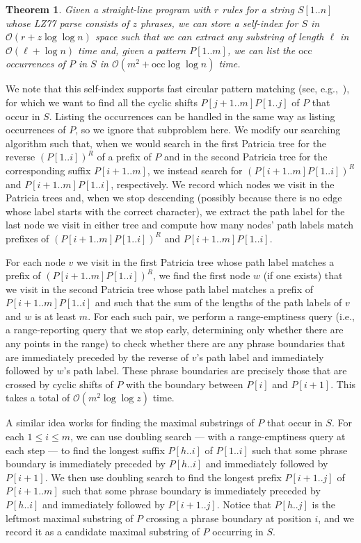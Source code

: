 \documentclass[review]{elsarticle}
\newtheorem{theorem}{Theorem}
\newcommand{\Oh}[1]
    {\ensuremath{\mathcal{O}\!\left( {#1} \right)}}
\newcommand{\occ}
    {\ensuremath{\mathrm{occ}}}
\begin{document}
\begin{theorem} \label{thm:unbalanced}
Given a straight-line program with $r$ rules for a string \(S [1..n]\) whose LZ77 parse consists of $z$ phrases, we can store a self-index for $S$ in $\Oh{r + z \log \log n}$ space such that we can extract any substring of length $\ell$ in $\Oh{\ell + \log n}$ time and, given a pattern \(P [1..m]\), we can list the $\occ$ occurrences of $P$ in $S$ in $\Oh{m^2 + \occ \log \log n}$ time.
\end{theorem}

We note that this self-index supports fast circular pattern matching (see, e.g.,~\cite{IR08}), for which we want to find all the cyclic shifts \(P [j + 1..m] P [1..j]\) of $P$ that occur in $S$.  Listing the occurrences can be handled in the same way as listing occurrences of $P$, so we ignore that subproblem here.  We modify our searching algorithm such that, when we would search in the first Patricia tree for the reverse \((P [1..i])^R\) of a prefix of $P$ and in the second Patricia tree for the corresponding suffix \(P [i + 1..m]\), we instead search for \((P [i + 1..m] P [1..i])^R\) and \(P [i + 1..m] P [1..i]\), respectively.  We record which nodes we visit in the Patricia trees and, when we stop descending (possibly because there is no edge whose label starts with the correct character), we extract the path label for the last node we visit in either tree and compute how many nodes' path labels match prefixes of \((P [i + 1..m] P [1..i])^R\) and \(P [i + 1..m] P [1..i]\).

For each node $v$ we visit in the first Patricia tree whose path label matches a prefix of \((P [i + 1..m] P [1..i])^R\), we find the first node $w$ (if one exists) that we visit in the second Patricia tree whose path label matches a prefix of \(P [i + 1..m] P [1..i]\) and such that the sum of the lengths of the path labels of $v$ and $w$ is at least $m$.  For each such pair, we perform a range-emptiness query (i.e., a range-reporting query that we stop early, determining only whether there are any points in the range) to check whether there are any phrase boundaries that are immediately preceded by the reverse of $v$'s path label and immediately followed by $w$'s path label.  These phrase boundaries are precisely those that are crossed by cyclic shifts of $P$ with the boundary between \(P [i]\) and \(P [i + 1]\).  This takes a total of $\Oh{m^2 \log \log z}$ time.

A similar idea works for finding the maximal substrings of $P$ that occur in $S$.  For each \(1 \leq i \leq m\), we can use doubling search --- with a range-emptiness query at each step --- to find the longest suffix \(P [h..i]\) of \(P [1..i]\) such that some phrase boundary is immediately preceded by \(P [h..i]\) and immediately followed by \(P [i + 1]\).  We then use doubling search to find the longest prefix \(P [i + 1..j]\) of \(P [i + 1..m]\) such that some phrase boundary is immediately preceded by \(P [h..i]\) and immediately followed by \(P [i + 1..j]\).  Notice that \(P [h..j]\) is the leftmost maximal substring of $P$ crossing a phrase boundary at position $i$, and we record it as a candidate maximal substring of $P$ occurring in $S$.
\end{document}
